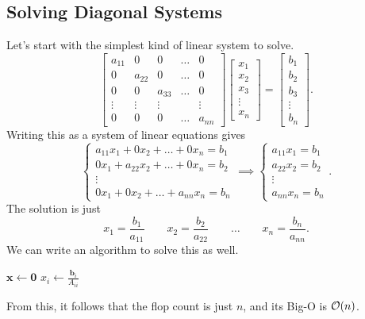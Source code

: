 \documentclass[letterpaper]{article}
\newcommand{\0}{\mathbf{0}}
\renewcommand{\b}{\mathbf{b}}
\newcommand{\x}{\mathbf{x}}
\begin{document}
\subsection{Solving Diagonal Systems}
Let's start with the simplest kind of linear system to solve.
\[\begin{bmatrix}
    a_{11} & 0 & 0 & \hdots & 0 \\ 
    0 & a_{22} & 0 & \hdots & 0 \\ 
    0 & 0 & a_{33} & \hdots & 0 \\ 
    \vdots & \vdots & \vdots & & \vdots  \\ 
    0 & 0 & 0 & \hdots & a_{nn}
\end{bmatrix} \begin{bmatrix}
    x_1 \\ x_2 \\ x_3 \\ \vdots \\ x_n
\end{bmatrix} = \begin{bmatrix}
    b_1 \\ b_2 \\ b_3 \\ \vdots \\ b_n
\end{bmatrix}.\]
Writing this as a system of linear equations gives 
\[\begin{cases}
    a_{11}x_1 + 0x_2 + \hdots + 0x_n = b_1 \\ 
    0x_1 + a_{22}x_2 + \hdots + 0x_n = b_2 \\ 
    \vdots \\ 
    0x_1 + 0x_2 + \hdots + a_{nn}x_n = b_n 
\end{cases} \implies \begin{cases}
    a_{11}x_1 = b_1 \\ 
    a_{22}x_2 = b_2 \\ 
    \vdots \\ 
    a_{nn}x_n = b_n 
\end{cases}.\]
The solution is just 
\[x_1 = \frac{b_1}{a_{11}} \qquad x_2 = \frac{b_2}{a_{22}} \qquad \hdots \qquad x_n = \frac{b_n}{a_{nn}}.\]
We can write an algorithm to solve this as well. 
\begin{algorithmic}
    \State $\x \gets \mathbf{0}$
        \State $x_i \gets \frac{\b_i}{A_{ii}}$
    \EndFor
\end{algorithmic}
From this, it follows that the flop count is just $n$, and its Big-O is $\mathcal{O}(n)$. 
\end{document}
